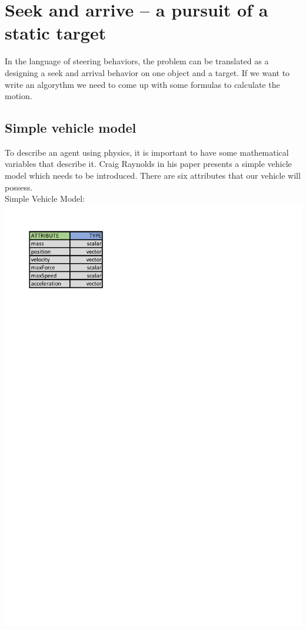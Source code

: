 \documentclass[10pt,twoside,english,a4paper]{article}
\begin{document}
\section{Seek and arrive – a pursuit of a static target} \label{seek and arrive}

In the language of steering behaviors, the problem can be translated as 
a designing a seek and arrival behavior on one object and a target. 
If we want to write an algorythm we need to come up with some 
formulas to calculate the motion.

\subsection{Simple vehicle model} \label{model}
To describe an agent using physics, it is important to have some
mathematical variables that describe it. Craig Raynolds in his 
paper \cite{Raynolds} presents a simple 
vehicle model which needs to be introduced. There are six 
attributes that our vehicle will possess. \\
Simple Vehicle Model: \\
\includegraphics[scale=0.6]{attributes.pdf}
\end{document}
